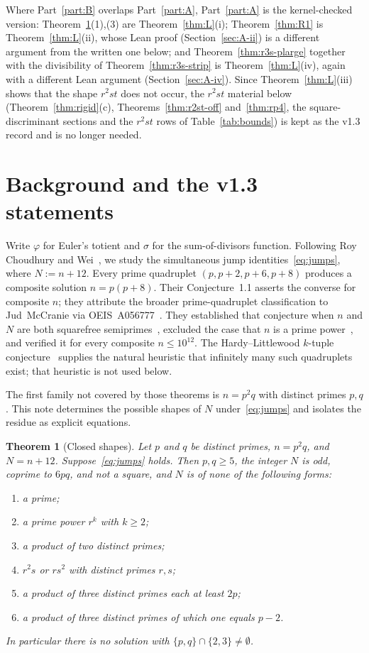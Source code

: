 \documentclass[11pt,reqno]{amsart}
\newcommand{\ph}{\varphi}
\newcommand{\sig}{\sigma}
\newtheorem{theorem}{Theorem}
\theoremstyle{definition}
\begin{document}
Where Part~\ref{part:B} overlaps Part~\ref{part:A}, Part~\ref{part:A} is the kernel-checked version: Theorem~\ref{thm:closed}(1),(3) are Theorem~\ref{thm:L}(i); Theorem~\ref{thm:R1} is Theorem~\ref{thm:L}(ii), whose Lean proof (Section~\ref{sec:A-ii}) is a different argument from the written one below; and Theorem~\ref{thm:r3s-plarge} together with the divisibility of Theorem~\ref{thm:r3s-strip} is Theorem~\ref{thm:L}(iv), again with a different Lean argument (Section~\ref{sec:A-iv}). Since Theorem~\ref{thm:L}(iii) shows that the shape \(r^2st\) does not occur, the \(r^2st\) material below (Theorem~\ref{thm:rigid}(c), Theorems~\ref{thm:r2st-off} and~\ref{thm:rp4}, the square-discriminant sections and the \(r^2st\) rows of Table~\ref{tab:bounds}) is kept as the v1.3 record and is no longer needed.

\section{Background and the v1.3 statements}

Write \(\ph\) for Euler's totient and \(\sig\) for the sum-of-divisors function.
Following Roy Choudhury and Wei~\cite{RCW2026}, we study the simultaneous jump identities~\eqref{eq:jumps}, where \(N:=n+12\). Every prime quadruplet \((p,p+2,p+6,p+8)\) produces a composite solution \(n=p(p+8)\).
Their Conjecture~1.1 asserts the converse for composite \(n\); they attribute the broader prime-quadruplet classification to Jud~McCranie via OEIS~A056777~\cite{RCW2026}. They established that conjecture when \(n\) and \(N\)
are both squarefree semiprimes~\cite[Thm.~2.2]{RCW2026}, excluded the case that \(n\) is a prime power~\cite[Thm.~3.1]{RCW2026},
and verified it for every composite \(n\le 10^{12}\). The Hardy--Littlewood \(k\)-tuple conjecture~\cite{HL1923} supplies the
natural heuristic that infinitely many such quadruplets exist; that heuristic is not used below.

The first family not covered by those theorems is \(n=p^2q\) with distinct primes \(p,q\). This note determines the possible
shapes of \(N\) under~\eqref{eq:jumps} and isolates the residue as explicit equations.

\begin{theorem}[Closed shapes]
\label{thm:closed}
Let \(p\) and \(q\) be distinct primes, \(n=p^2q\), and \(N=n+12\).
Suppose~\eqref{eq:jumps} holds. Then \(p,q\ge 5\), the integer \(N\) is odd, coprime to \(6pq\), and not a square, and \(N\) is of none of the following forms:
\begin{enumerate}
\item a prime;
\item a prime power \(r^k\) with \(k\ge 2\);
\item a product of two distinct primes;
\item \(r^2s\) or \(rs^2\) with distinct primes \(r,s\);
\item a product of three distinct primes each at least \(2p\);
\item a product of three distinct primes of which one equals \(p-2\).
\end{enumerate}
In particular there is no solution with \(\{p,q\}\cap\{2,3\}\ne\emptyset\).
\end{theorem}
\end{document}
